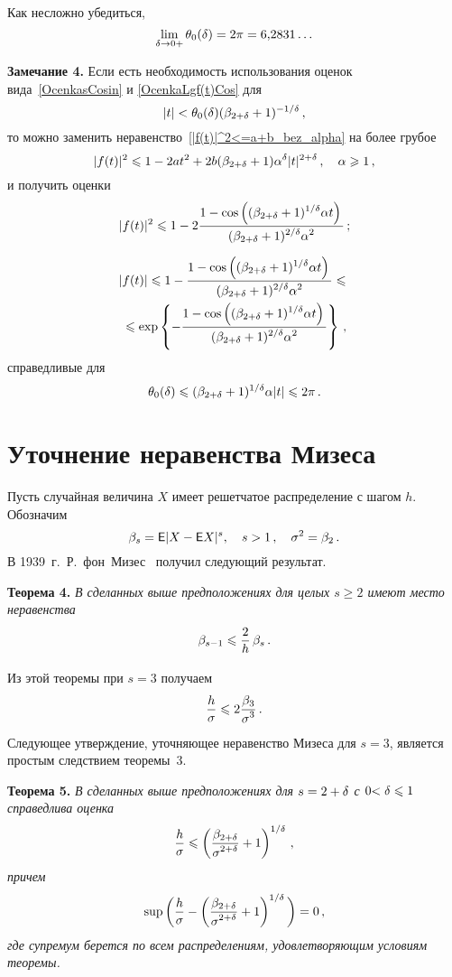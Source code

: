 \begin{multicols}{2}
\bigskip
\addtocounter{table}{1}




Как несложно убедиться,
$$
\lim_{\delta\to0+}\theta_0(\delta)=2\pi=6{,}2831\ldots
$$

\medskip

\noindent
\textbf{Замечание 4.}
Если есть необходимость использования оценок
вида~\eqref{OcenkasCosin} и \eqref{OcenkaLgf(t)Cos} для
$$|t|<\theta_0(\delta)(\beta_{2+\delta}+1)^{-1/\delta}\,,$$
 то можно заменить
неравенство~\eqref{|f(t)|^2<=a+b_bez_alpha} на более грубое
$$
|f(t)|^2\leqslant 1-2at^2+2b(\beta_{2+\delta}+1)\alpha^\delta|t|^{2+\delta}\,,\quad
\alpha\geqslant1\,,
$$
и получить оценки
$$
|f(t)|^2\leqslant1- 2\displaystyle\frac{\displaystyle 1-\cos\left((\beta_{2+\delta}+1)^{1/\delta}\alpha
t\right)\mathstrut}{\displaystyle (\beta_{2+\delta}+1)^{2/\delta}\alpha^2\mathstrut}\,;
$$
\vspace*{-12pt}

\noindent
\begin{multline*}
|f(t)|\leqslant 1-\displaystyle\frac{\displaystyle 1-\cos\left((\beta_{2+\delta}+1)^{1/\delta}\alpha t\right)\mathstrut}{\displaystyle (\beta_{2+\delta}+1)^{2/\delta}\alpha^2\mathstrut}\leqslant{}\\
{}\leqslant
\exp\left\{-\displaystyle\frac{\displaystyle 1-\cos\left((\beta_{2+\delta}+1)^{1/\delta}\alpha t\right)\mathstrut}{\displaystyle (\beta_{2+\delta}+1)^{2/\delta}\alpha^2\mathstrut}\right\}\,,
\end{multline*}
справедливые для
$$
\theta_0(\delta)\leqslant (\beta_{2+\delta}+1)^{1/\delta}\alpha|t|  \leqslant2\pi\,.
$$


\section{Уточнение неравенства Мизеса}

Пусть случайная величина $X$ имеет решетчатое распределение с шагом
$h$. Обозначим
$$
\beta_s={\sf E}|X-{\sf E} X|^s,\quad s>1\,,\quad \sigma^2=\beta_2\,.
$$
В 1939~г.\ Р.~фон~Мизес~\cite{Mises1939} получил следующий результат.

\medskip

\noindent
\textbf{Теорема 4.}
\textit{В сделанных выше предположениях для целых $s\ge2$ имеют место
неравенства}
$$
\beta_{s-1}\leqslant \displaystyle\frac{\displaystyle 2\mathstrut}{\displaystyle h\mathstrut}\,\beta_s\,.
$$

Из этой теоремы при $s=3$ получаем
$$
\displaystyle\frac{\displaystyle h\mathstrut}{\displaystyle \sigma\mathstrut}\leqslant 2 \displaystyle\frac{\displaystyle \beta_3\mathstrut}{\displaystyle \sigma^3\mathstrut}\,.
$$
Следующее утверждение, уточняющее неравенство Мизеса для $s=3$,
является простым следствием теоремы~3.

\noindent
\textbf{Теорема 5.}
\textit{В сделанных выше предположениях для ${s=2+\delta}$ с $0{<\delta\leqslant1}$
справедлива оценка}
\begin{equation}
\label{ShevtsovaUtochnilaMisesa}
\displaystyle\frac{\displaystyle h\mathstrut}{\displaystyle \sigma\mathstrut}\leqslant \left(\displaystyle\frac{\displaystyle \beta_{2+\delta}\mathstrut}{\displaystyle \sigma^{2+\delta}\mathstrut}+1\right)^{1/\delta}\,,
\end{equation}
\textit{причем}
\begin{equation}
\label{ExactnessOfShevtsova}
\sup\bigg(\displaystyle\frac{\displaystyle h\mathstrut}{\displaystyle \sigma\mathstrut}-
\left(\displaystyle\frac{\displaystyle \beta_{2+\delta}\mathstrut}{\displaystyle \sigma^{2+\delta}\mathstrut}+1\right)^{1/\delta}\bigg)=0\,,
\end{equation}
\textit{где супремум берется по всем распределениям, удовлетворяющим
условиям теоремы.}
\medskip


\end{multicols}
